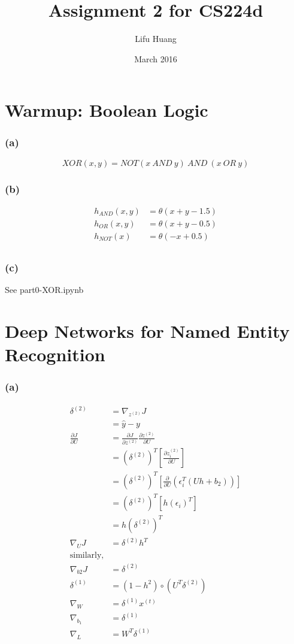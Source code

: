 \documentclass{article}
\title{Assignment 2 for CS224d}
\author{Lifu Huang}
\date{March 2016}
\begin{document}
\maketitle
\setcounter{section}{-1}
\section{Warmup: Boolean Logic}
\subsubsection*{(a)}
\begin{equation}
XOR(x, y) = NOT(x\ AND\ y)\ AND\ (x\ OR\ y)
\end{equation}
\subsubsection*{(b)}
\begin{align}
h_{AND}(x, y) &= \theta(x + y - 1.5) \\
h_{OR}(x, y) &= \theta(x + y - 0.5) \\
h_{NOT}(x) &= \theta(-x + 0.5) \\
\end{align}
\subsubsection*{(c)}
See part0-XOR.ipynb

\section{Deep Networks for Named Entity Recognition}
\subsubsection*{(a)}
\begin{align}
\delta^{(2)}
&= \nabla_{z^{(2)}} J\\
&= \hat{y} - y\\
\frac{\partial J}{\partial U} 
&= \frac{\partial J}{\partial z^{(2)}} \frac{\partial z^{(2)}}{\partial U} \\
&= (\delta^{(2)})^T \left[\frac{\partial z^{(2)}_i}{\partial U}\right] \\
&= (\delta^{(2)})^T \left[\frac{\partial }{\partial U} (\epsilon_i^T (U h + b_2))\right] \\
&= (\delta^{(2)})^T \left[h(\epsilon_i)^T\right] \\
&= h (\delta^{(2)})^T \\
\nabla_U J &= \delta^{(2)}h^T \\
\text{similarly,}\\
\nabla_{b2} J &= \delta^{(2)} \\
\delta^{(1)} &= (1 - h^2) \circ (U^T \delta^{(2)}) \\
\nabla_{W} &= \delta^{(1)} x^{(t)} \\ 
\nabla_{b_1} &= \delta^{(1)} \\
\nabla_{L} &= W^T \delta^{(1)}
\end{align}
\end{document}
